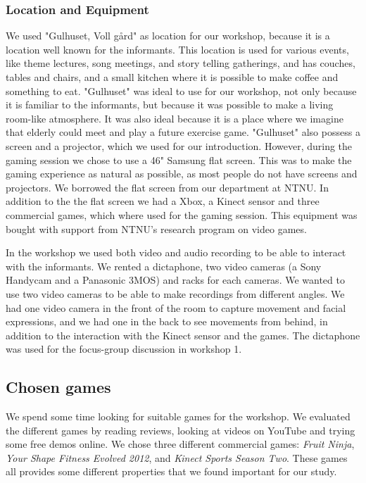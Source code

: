 \subsubsection{Location and Equipment}
We used "Gulhuset, Voll gård" as location for our workshop, because it is a location well known for the informants. This location is used for various events, like theme lectures, song meetings, and story telling gatherings, and has couches, tables and chairs, and a small kitchen where it is possible to make coffee and something to eat. "Gulhuset" was ideal to use for our workshop, not only because it is familiar to the informants, but because it was possible to make a living room-like atmosphere. It was also ideal because it is a place where we imagine that elderly could meet and play a future exercise game. "Gulhuset" also possess a screen and a projector, which we used for our introduction. However, during the gaming session we chose to use a 46" Samsung flat screen. This was to make the gaming experience as natural as possible, as most people do not have screens and projectors. We borrowed the flat screen from our department at NTNU. In addition to the the flat screen we had a Xbox, a Kinect sensor and three commercial games, which where used for the gaming session. This equipment was bought with support from NTNU's research program on video games.   

In the workshop we used both video and audio recording to be able to interact with the informants. We rented a dictaphone, two video cameras (a Sony Handycam and a Panasonic 3MOS) and racks for each cameras. We wanted to use two video cameras to be able to make recordings from different angles. We had one video camera in the front of the room to capture movement and facial expressions, and we had one in the back to see movements from behind, in addition to the interaction with the Kinect sensor and the games. The dictaphone was used for the focus-group discussion in workshop 1.    

\subsection{Chosen games}
\label{sec:chosengames}
We spend some time looking for suitable games for the workshop. We evaluated the different games by reading reviews, looking at videos on YouTube and trying some free demos online. We chose three different commercial games: \emph{Fruit Ninja}, \emph{Your Shape Fitness Evolved 2012}, and \emph{Kinect Sports Season Two}. These games all provides some different properties that we found important for our study.  

